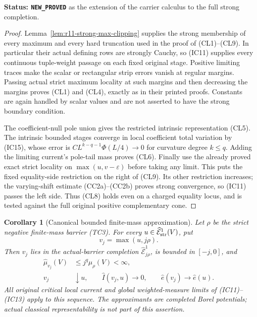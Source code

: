 \documentclass[11pt,a4paper]{article}
\numberwithin{equation}{section}
\newtheorem{corollary}[theorem]{Corollary}
\theoremstyle{definition}
\theoremstyle{remark}
\begin{document}
\noindent\textbf{Status: \texttt{NEW\_PROVED}} as the extension
of the carrier calculus to the full strong completion.

\begin{proof}
Lemma~\ref{lem:r11-strong-max-clipping} supplies the strong
membership of every maximum and every hard truncation used
in the proof of (CL1)--(CL9). In particular their actual
defining rows are strongly Cauchy, so (IC11) supplies every
continuous tuple-weight passage on each fixed original stage.
Positive limiting traces make the scalar or rectangular strip
errors vanish at regular margins. Passing actual strict
maximum locality at such margins and then decreasing the
margins proves (CL1) and (CL4), exactly as in their printed
proofs. Constants are again handled by scalar values and are
not asserted to have the strong boundary condition.

The coefficient-null pole union gives the restricted intrinsic
representation (CL5). The intrinsic bounded stages converge
in local coefficient total variation by (IC15), whose error
is $C L^{k-q-1}\Phi(L/4)\to0$ for curvature degree $k\leq q$.
Adding the limiting current's pole-tail mass proves (CL6).
Finally use the already proved exact strict locality on
$\max(u,v-\varepsilon)$ before taking any limit. This puts
the fixed equality-side restriction on the right of (CL9).
Its other restriction increases; the varying-shift estimate
(CC2a)--(CC2b) proves strong convergence, so (IC11) passes
the left side.
Thus (CL8) holds even on a charged equality locus, and is
tested against the full original positive complementary cone.
\end{proof}

\begin{corollary}[Canonical bounded finite-mass approximation]
\label{cor:r11-strong-finite-mass-barrier-approximation}
Let $\rho$ be the strict negative finite-mass barrier (TC3).
For every $u\in\widehat{\mathcal E}^1_{\rm str}(V)$, put
\[
                             v_j=\max(u,j\rho).
\]
Then $v_j$ lies in the actual-barrier completion
$\widehat{\mathcal E}^1_{j\rho}$, is bounded in $[-j,0]$, and
\[
 \begin{split}
 \widehat\mu_{v_j}(V)&\leq j^q\mu_\rho(V)<\infty,\\
 v_j&\downarrow u,\qquad
 \widehat I(v_j,u)\longrightarrow0,
 \qquad \widehat e(v_j)\longrightarrow\widehat e(u).
 \end{split}
 \tag{CC11}
\]
All original critical local current and global weighted-measure
limits of (IC11)--(IC13) apply to this sequence.
The approximants are completed Borel potentials; actual
classical representability is not part of this assertion.
\end{corollary}
\end{document}
